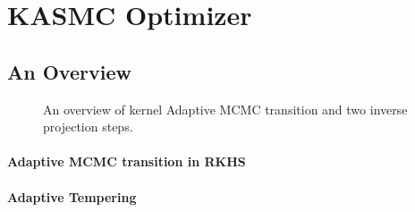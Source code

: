 \documentclass{article} %
\begin{document}
\section{KASMC Optimizer}

\subsection{An Overview}
\begin{figure}[t]
	\centering
	\quad\quad
	\caption{An overview of kernel Adaptive MCMC transition and two inverse projection steps.}
\end{figure}

\paragraph{Adaptive MCMC transition in RKHS}
\paragraph{Adaptive Tempering}
\end{document}

